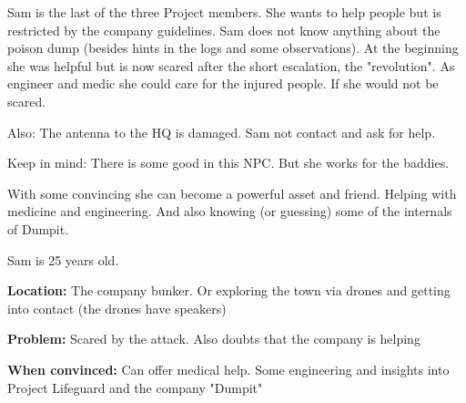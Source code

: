 \begin{npcBox}[title=Sam]
    \begin{consequences}
    \item {}
    \item {}
    \item {}
    \end{consequences}

    \begin{npcDescription}
    Sam is the last of the three Project members. She wants to help people but is restricted by the company guidelines. Sam does not know anything about the poison dump (besides hints in the logs and some observations). At the beginning she was helpful but is now scared after the short escalation, the "revolution". As engineer and medic she could care for the injured people. If she would not be scared.

    Also: The antenna to the HQ is damaged. Sam not contact and ask for help.

    Keep in mind: There is some good in this NPC. But she works for the baddies.

    With some convincing she can become a powerful asset and friend. Helping with medicine and engineering. And also knowing (or guessing) some of the internals of Dumpit.

    Sam is 25 years old.

    \textbf{Location:} The company bunker. Or exploring the town via drones and getting into contact (the drones have speakers)

    \textbf{Problem:} Scared by the attack. Also doubts that the company is helping

    \textbf{When convinced:} Can offer medical help. Some engineering and insights into Project Lifeguard and the company "Dumpit"
    \end{npcDescription}

\end{npcBox}

\newpage

